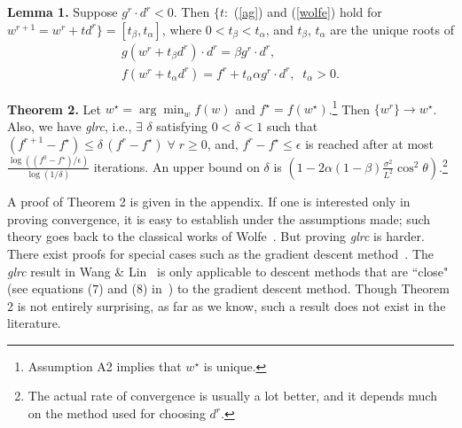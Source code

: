 
{\bf Lemma 1.} Suppose $g^r\cdot d^r<0$.
Then $\{ t: $ (\ref{ag}) and (\ref{wolfe}) hold for $w^{r+1}=w^r+td^r\} = [t_\beta,t_\alpha]$, where $0<t_\beta<t_\alpha$, and $t_\beta$, $t_\alpha$ are the unique roots of
\begin{eqnarray}
g(w^r+t_\beta d^r)\cdot d^r = \beta g^r\cdot d^r, \label{tbeta} \\
f(w^r+t_\alpha d^r) = f^r + t_\alpha \alpha g^r\cdot d^r, \;\; t_\alpha>0. \label{talpha}
\end{eqnarray}


{\bf Theorem 2.} Let $w^\star=\arg\min_w f(w)$ and $f^\star=f(w^\star)$.\footnote{Assumption A2 implies that $w^\star$ is unique.} Then $\{w^r\}\rightarrow w^\star$. Also, we have {\it glrc}, i.e., $\exists$ $\delta$ satisfying $0<\delta<1$ such that
$(f^{r+1} - f^\star) \le \delta\, (f^r-f^\star) \; \forall \; r\ge 0$,
and, $f^r-f^\star\le\epsilon$ is reached after at most
$\frac{\log ((f^0-f^\star)/\epsilon)}{\log(1/\delta)}$
iterations. An upper bound on $\delta$ is $(1 - 2\alpha(1-\beta)\frac{\sigma^2}{L^2} \cos^2\theta)$.\footnote{The actual rate of convergence is usually a lot better, and it depends much on the method used for choosing $d^r$.}

A proof of Theorem 2 is given in the appendix. If one is interested only in proving convergence, it is easy to establish under the assumptions made; such theory goes back to the classical works of Wolfe~. But proving {\it glrc} is harder. There exist proofs for special cases such as the gradient descent method~\cite{boyd2004}. The {\it glrc} result in Wang \& Lin~ is only applicable to descent methods that are ``close" (see equations ($7$) and ($8$) in~\cite{wang2013}) to the gradient descent method. Though Theorem 2 is not entirely surprising, as far as we know, such a result does not exist in the literature.
